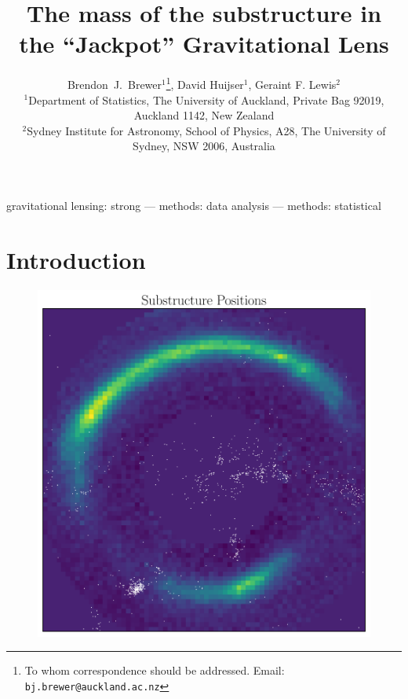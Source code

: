 \documentclass[useAMS,usenatbib]{mn2e}
\title[]
{The mass of the substructure in the ``Jackpot'' Gravitational Lens}
\author[Brewer, Huijser and Lewis]{%
  Brendon~J.~Brewer$^{1}$\thanks{To whom correspondence should be addressed. Email: {\tt bj.brewer@auckland.ac.nz}},
  David Huijser$^{1}$,
  Geraint F. Lewis$^2$
  \medskip\\
  $^1$Department of Statistics, The University of Auckland, Private Bag 92019, Auckland 1142, New Zealand\\
  $^2$Sydney Institute for Astronomy, School of Physics, A28,
  The University of Sydney, NSW 2006, Australia}
\begin{document}
             
\date{}
             
\maketitle

\label{firstpage}

\begin{abstract}

\end{abstract}


\begin{keywords}
gravitational lensing: strong --- methods: data analysis --- methods: statistical
\end{keywords}

\section{Introduction}


\begin{figure}
\centering
\includegraphics[scale=0.45]{substructures.pdf}
\caption{\label{fig:substructures}}
\end{figure}
\end{document}
